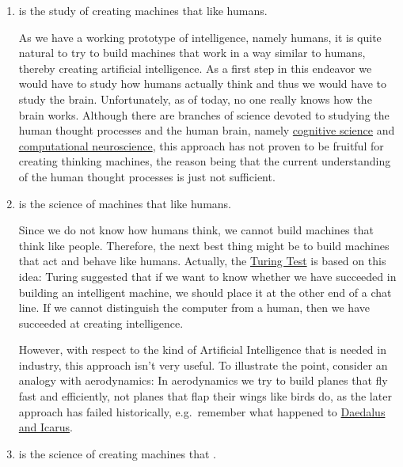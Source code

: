 \begin{enumerate}
\item {} is the study of creating machines that  like humans.

      As we have a working prototype of intelligence, namely humans, it is quite natural to try to
      build machines that work in a way similar to humans, thereby creating artificial
      intelligence.  As a first step in this endeavor we would have to study how humans actually
      think and thus we would have to study the brain.  Unfortunately, as of today, no one really
      knows how the brain works.  Although there are branches of science devoted to studying the
      human thought processes and the human brain, namely
      \href{https://en.wikipedia.org/wiki/Cognitive_science}{cognitive science} and 
      \href{https://en.wikipedia.org/wiki/Computational_neuroscience}{computational neuroscience},
      this approach has not proven to be fruitful for creating thinking machines, the reason being
      that the current understanding of the human thought processes is just not sufficient.  

\item {} is the science of machines that  like humans.

      Since we do not know how humans think,  we cannot build machines that think like people.
      Therefore, the next best thing might be to build  machines that act and behave like humans.  
      Actually, the \href{https://en.wikipedia.org/wiki/Turing_test}{Turing Test} is based on this
      idea:  Turing suggested that if we want to know whether we have succeeded in building an
      intelligent machine, we should place it at the other end of a chat line.  If we cannot
      distinguish the computer from a human, then we have succeeded at creating intelligence. 

      However, with respect to the kind of Artificial Intelligence that is needed in industry, this
      approach isn't very useful.  To illustrate the point, consider an analogy with aerodynamics:
      In aerodynamics we try to build planes that fly fast and efficiently, not planes that flap
      their wings like birds do, as the later approach has failed historically, 
      e.g.~remember what happened to 
      \href{https://en.wikipedia.org/wiki/Daedalus#Daedalus_and_Icarus}{Daedalus and Icarus}.
\item {} is the science of creating machines that .


\end{enumerate}
